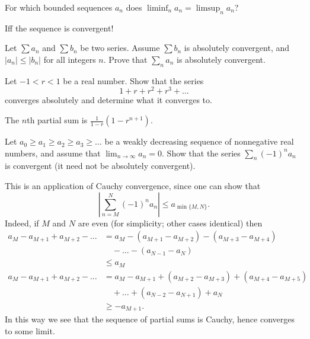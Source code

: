 \begin{problem}
	For which bounded sequences $a_n$
	does $\liminf_n a_n = \limsup_n a_n$?
	\begin{hint}
		Iff the sequence is convergent!
	\end{hint}
\end{problem}

\begin{dproblem}
	Let $\sum a_n$ and $\sum b_n$ be two series.
	Assume $\sum b_n$ is absolutely convergent,
	and $|a_n| \le |b_n|$ for all integers $n$.
	Prove that $\sum_n a_n$ is absolutely convergent.
\end{dproblem}

\begin{problem}
	\label{prob:geometric}
	Let $-1 < r < 1$ be a real number.
	Show that the series
	\[ 1 + r + r^2 + r^3 + \dots \]
	converges absolutely and determine what it converges to.
	\begin{hint}
		The $n$th partial sum is $\frac{1}{1-r} (1-r^{n+1})$.
	\end{hint}
\end{problem}


\begin{problem}
	Let $a_0 \ge a_1 \ge a_2 \ge a_3 \ge \dots$ be a weakly decreasing sequence
	of nonnegative real numbers,
	and assume that $\lim_{n \to \infty} a_n = 0$.
	Show that the series $\sum_n (-1)^n a_n$ is convergent
	(it need not be absolutely convergent).
	\begin{sol}
		This is an application of Cauchy convergence, since
		one can show that
		\[ \left\lvert \sum_{n=M}^N (-1)^n a_n \right\rvert \le a_{\min\{M,N\}}. \]
		Indeed, if $M$ and $N$ are even
		(for simplicity; other cases identical) then
		\begin{align*}
			a_M - a_{M+1} + a_{M+2} - \dots
			&= a_M - (a_{M+1}-a_{M+2}) - (a_{M+3}-a_{M+4}) \\
			&\quad- \dots - (a_{N-1} - a_N) \\
			&\le a_M \\
			a_M - a_{M+1} + a_{M+2} - \dots
			&= a_M - a_{M+1} + (a_{M+2} - a_{M+3}) + (a_{M+4} - a_{M+5}) \\
			&\quad+ \dots + (a_{N-2} - a_{N+1}) + a_N \\
			&\ge -a_{M+1}.
		\end{align*}
		In this way we see that the sequence of partial sums is Cauchy,
		hence converges to some limit.
	\end{sol}
\end{problem}


